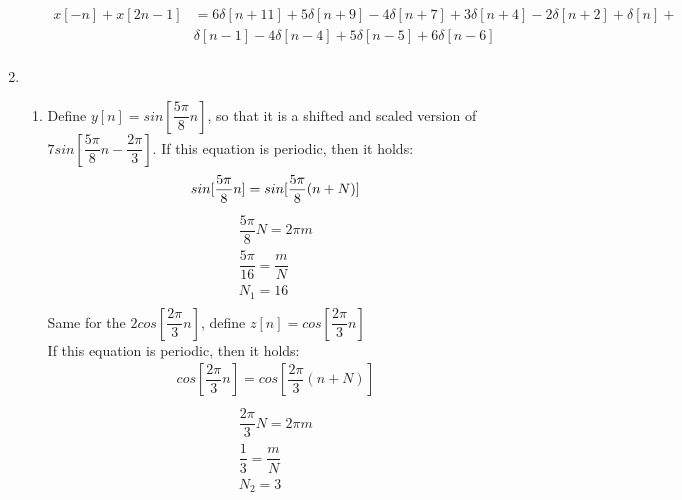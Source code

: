 \documentclass[10pt,a4paper, margin=1in]{article}
\begin{document}
\begin{enumerate}
\begin{enumerate}
            \begin{equation}
	\begin{split}
		x[-n] + x[2n-1] &=  6 \delta[n+11] + 5\delta[n+9] -4\delta[n+7] + 3\delta[n+4]-2\delta[n+2]+\delta[n]+\\ & \delta[n-1]-4\delta[n-4]+5\delta[n-5]+6\delta[n-6]  \\
		\end{split}
	\end{equation}
    \end{enumerate}

\item 
    \begin{enumerate}
    \item %
    Define $y[n] = sin[\dfrac{5\pi}{8} n]$, so that it is a shifted and scaled version of $7sin[\dfrac{5\pi}{8} n - \dfrac{2\pi}{3}]$.
    If this equation is periodic, then it holds:
    \begin{equation}
        sin[\dfrac{5\pi}{8}n] = sin[\dfrac{5\pi}{8}(n+N)]\\
    \end{equation}
    \begin{equation}
    \begin{split}
        \dfrac{5\pi}{8}N = 2\pi m\\
        \dfrac{5\pi}{16} = \dfrac{m}{N}\\
        N_1 = 16\\
    \end{split}
    \end{equation}
    Same for the $2cos[\dfrac{2\pi}{3}n]$, define $z[n] = cos[\dfrac{2\pi}{3}n]$\\
    If this equation is periodic, then it holds:
    \begin{equation}
        \begin{split}
            cos[\dfrac{2\pi}{3}n] = cos[\dfrac{2\pi}{3}(n+N)]\\
        \end{split}
    \end{equation}
    \begin{equation}
        \begin{split}
            \dfrac{2\pi}{3}N = 2\pi m\\
            \dfrac{1}{3} = \dfrac{m}{N}\\
            N_2 = 3\\
        \end{split}
    \end{equation}

\end{enumerate}
\end{enumerate}
\end{document}
